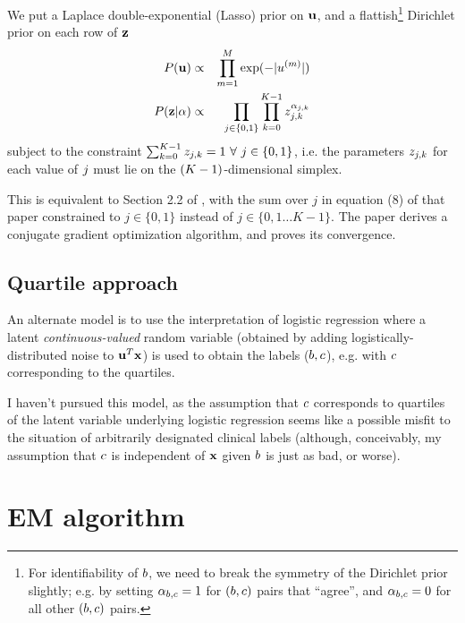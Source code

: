\documentclass{article}
\begin{document}
We put a Laplace double-exponential (Lasso) prior on ${\bf u}$, and a flattish\footnote{
  For identifiability of $b$, we need to break the symmetry of the Dirichlet prior slightly;
  e.g. by setting $\alpha_{b,c} = 1$ for $(b,c)$ pairs that ``agree'',
  and $\alpha_{b,c} = 0$ for all other $(b,c)$ pairs.
} Dirichlet prior on each row of ${\bf z}$
\begin{eqnarray*}
P({\bf u}) & \propto & \prod_{m=1}^{M} \exp(-|u^{(m)}|) \\
P({\bf z}|\alpha) & \propto & \prod_{j \in \{0,1\}}
\prod_{k=0}^{K-1} z_{j,k}^{\alpha_{j,k}}
\end{eqnarray*}
subject to the constraint $\sum_{\catlabelindex=0}^{\catlabels-1} \labelerrprob_{\binlabelindex,\catlabelindex} = 1\ \forall\ \binlabelindex \in \{0,1\}$,
i.e. the parameters $z_{j,k}$ for each value of $j$ must lie on the $(K-1)$-dimensional simplex.

This is equivalent to Section 2.2 of \cite{BootkrajangKaban2012},
with the sum over $j$ in equation (8) of that paper constrained to $j\in\{0,1\}$
instead of $j\in\{0,1\ldots K-1\}$.
The paper derives a conjugate gradient optimization algorithm,
and proves its convergence.

\subsection{Quartile approach}

An alternate model is to use the interpretation of logistic regression where a latent {\em continuous-valued} random variable
(obtained by adding logistically-distributed noise to ${\bf u}^T {\bf x}$)
is used to obtain the labels ($b,c$),
e.g. with $c$ corresponding to the quartiles.

I haven't pursued this model, as the assumption that $c$ corresponds to quartiles of the latent variable underlying
logistic regression seems like a possible misfit to the situation of arbitrarily designated clinical labels
(although, conceivably, my assumption that $c$ is independent of ${\bf x}$ given $b$ is just as bad, or worse).


\section{EM algorithm}
\end{document}
